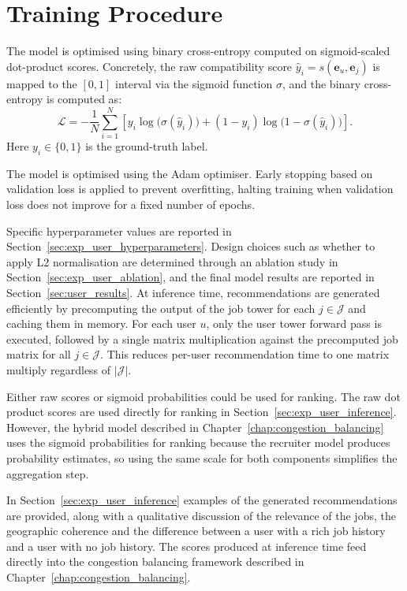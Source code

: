 \section{Training Procedure}
\label{sec:user_training}

The model is optimised using binary cross-entropy computed on 
sigmoid-scaled dot-product scores. Concretely, the raw compatibility 
score $\hat{y}_i = s(\mathbf{e}_u, \mathbf{e}_j)$ is mapped to the $[0,1]$ interval via the sigmoid function $\sigma$, and the binary 
cross-entropy is computed as:
\begin{equation}
\mathcal{L} = -\frac{1}{N} \sum_{i=1}^{N} \left[ y_i 
\log\big(\sigma(\hat{y}_i)\big) + (1 - y_i) 
\log\big(1 - \sigma(\hat{y}_i)\big) \right].
\end{equation}
Here $y_i \in \{0,1\}$ is the ground-truth label.

The model is optimised using the Adam optimiser. Early stopping 
based on validation loss is applied to prevent overfitting, halting 
training when validation loss does not improve for a fixed number 
of epochs.

Specific hyperparameter values are reported in 
Section~\ref{sec:exp_user_hyperparameters}. Design choices such 
as whether to apply L2 normalisation are determined through an 
ablation study in Section~\ref{sec:exp_user_ablation}, and the 
final model results are reported in 
Section~\ref{sec:user_results}.
\label{sec:user_inference}
At inference time, recommendations are generated efficiently by precomputing the output of the job tower for each $j \in \mathcal{J}$ and caching them in memory. For each user $u$, only the user tower forward pass is executed, followed by a single matrix multiplication against the precomputed job matrix for all $j \in \mathcal{J}$. This reduces per-user recommendation time to one matrix multiply regardless of $|\mathcal{J}|$.
 
Either raw scores or sigmoid probabilities could be used for ranking. The raw dot product scores are used directly for ranking in Section~\ref{sec:exp_user_inference}. However, the hybrid model described in Chapter~\ref{chap:congestion_balancing} uses the sigmoid probabilities for ranking because the recruiter model produces probability estimates, so using the same scale for both components simplifies the aggregation step. 
 
In Section~\ref{sec:exp_user_inference} examples of the generated recommendations are provided, along with a qualitative discussion of the relevance of the jobs, the geographic coherence and the difference between a user with a rich job history and a user with no job history. The scores produced at inference time feed directly into the congestion balancing framework described in Chapter~\ref{chap:congestion_balancing}.